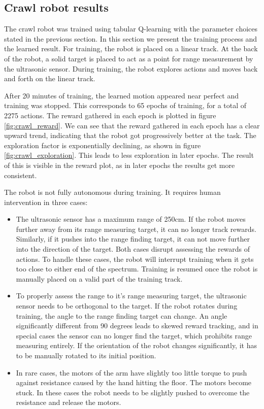 \documentclass[11pt, a4paper]{article}
\begin{document}
\subsection{Crawl robot results}
The crawl robot was trained using tabular Q-learning with the parameter choices stated in the previous section. In this section we present the training process and the learned result. For training, the robot is placed on a linear track. At the back of the robot, a solid target is placed to act as a point for range measurement by the ultrasonic sensor. During training, the robot explores actions and moves back and forth on the linear track. 

After 20 minutes of training, the learned motion appeared near perfect and training was stopped. This corresponds to 65 epochs of training, for a total of 2275 actions. The reward gathered in each epoch is plotted in figure \ref{fig:crawl_reward}. We can see that the reward gathered in each epoch has a clear upward trend, indicating that the robot got progressively better at the task. The exploration factor is exponentially declining, as shown in figure \ref{fig:crawl_exploration}. This leads to less exploration in later epochs. The result of this is visible in the reward plot, as in later epochs the results get more consistent.

The robot is not fully autonomous during training. It requires human intervention in three cases:
\begin{itemize}
	\item The ultrasonic sensor has a maximum range of 250cm. If the robot moves further away from its range measuring target, it can no longer track rewards. Similarly, if it pushes into the range finding target, it can not move further into the direction of the target. Both cases disrupt assessing the rewards of actions. To handle these cases, the robot will interrupt training when it gets too close to either end of the spectrum. Training is resumed once the robot is manually placed on a valid part of the training track.
	\item To properly assess the range to it's range measuring target, the ultrasonic sensor needs to be orthogonal to the target. If the robot rotates during training, the angle to the range finding target can change. An angle significantly different from 90 degrees leads to skewed reward tracking, and in special cases the sensor can no longer find the target, which prohibits range measuring entirely. If the orientation of the robot changes significantly, it has to be manually rotated to its initial position.
	\item In rare cases, the motors of the arm have slightly too little torque to push against resistance caused by the hand hitting the floor. The motors become stuck. In these cases the robot needs to be slightly pushed to overcome the resistance and release the motors.
\end{itemize}
\end{document}
